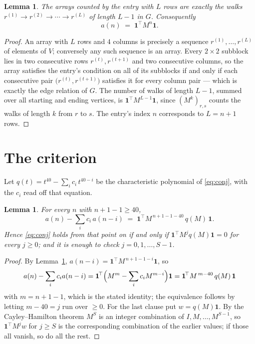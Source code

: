 \documentclass[11pt,a4paper]{article}
\theoremstyle{plain}
\newtheorem{lemma}[theorem]{Lemma}
\theoremstyle{definition}
\begin{document}
\begin{lemma}\label{lem:walk}
The arrays counted by the entry with $L$ rows are exactly the walks
$r^{(1)}\to r^{(2)}\to\cdots\to r^{(L)}$ of length $L-1$ in $G$. Consequently
\[
a(n)\;=\;\mathbf{1}^{\!\top}M^{n}\mathbf{1} .
\]
\end{lemma}

\begin{proof}
An array with $L$ rows and $4$ columns is precisely a sequence
$r^{(1)},\dots,r^{(L)}$ of elements of $V$; conversely any such sequence is an array.
Every $2\times2$ subblock lies in two consecutive rows $r^{(t)},r^{(t+1)}$ and two
consecutive columns, so the array satisfies the entry's condition on all of its subblocks
if and only if each consecutive pair $\bigl(r^{(t)},r^{(t+1)}\bigr)$ satisfies it for
every column pair --- which is exactly the edge relation of $G$. The number of walks of
length $L-1$, summed over all starting and ending vertices, is
$\mathbf{1}^{\!\top}M^{L-1}\mathbf{1}$, since $(M^{k})_{r,s}$ counts the walks of
length $k$ from $r$ to $s$. The entry's index $n$ corresponds to $L=n+1$ rows.
\end{proof}

\section{The criterion}

Let $q(t)=t^{40}-\sum_i c_i\,t^{40-i}$ be the characteristic polynomial of
\eqref{eq:conj}, with the $c_i$ read off that equation.

\begin{lemma}\label{lem:crit}
For every $n$ with $n+1-1\ge40$,
\[
a(n)-\sum_i c_i\,a(n-i)\;=\;\mathbf{1}^{\!\top}M^{\,n+1-1-40}\,q(M)\,\mathbf{1} .
\]
Hence \eqref{eq:conj} holds from that point on if and only if
$\mathbf{1}^{\!\top}M^{j}q(M)\mathbf{1}=0$ for every $j\ge0$; and it is enough to check
$j=0,1,\dots,S-1$.
\end{lemma}

\begin{proof}
By Lemma~\ref{lem:walk}, $a(n-i)=\mathbf{1}^{\!\top}M^{\,n+1-1-i}\mathbf{1}$, so
\[
a(n)-\sum_i c_i a(n-i)
=\mathbf{1}^{\!\top}\Bigl(M^{m}-\sum_i c_i M^{m-i}\Bigr)\mathbf{1}
=\mathbf{1}^{\!\top}M^{\,m-40}\,q(M)\,\mathbf{1}
\]
with $m=n+1-1$, which is the stated identity; the equivalence follows by letting
$m-40=j$ run over $\ge0$. For the last clause put $w=q(M)\mathbf{1}$. By the
Cayley--Hamilton theorem $M^{S}$ is an integer combination of $I,M,\dots,M^{S-1}$, so
$\mathbf{1}^{\!\top}M^{j}w$ for $j\ge S$ is the corresponding combination of the earlier
values; if those all vanish, so do all the rest.
\end{proof}
\end{document}
